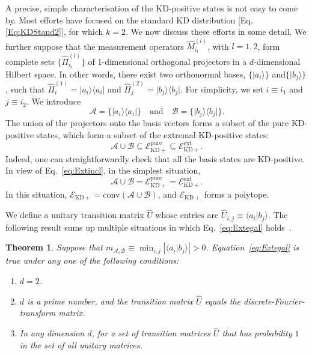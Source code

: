 \documentclass[%
 reprint,
superscriptaddress,
nofootinbib,
bibnotes,
 amsmath,amssymb,
 aps,
]{revtex4-1}
\theoremstyle{plain}
\newcommand*{\ketbra}[2]{\lvert #1 \rangle\!\langle #2 \rvert}
\newcommand{\cket}[1]{|#1\rangle}
\newcommand{\bracket}[2]{\langle #1|#2\rangle}
\newcommand{\Acal}{{\mathcal A}}
\newcommand{\Bcal}{{\mathcal B}}
\newcommand{\EcalKDC}{{\mathcal E}_{\mathrm{KD+}}}
\newcommand{\EcalKDCpu}{{\mathcal E}_{\mathrm{KD+}}^{\mathrm{pure}}}
\newcommand{\EcalKDCext}{{\mathcal E}_{\mathrm{KD+}}^{\mathrm{ext}}}
\newcommand{\mab}{m_{\Acal,\Bcal}}
\newcommand{\conv}[1]{\mathrm{conv}\left(#1\right)}
\newcommand{\convAB}{\conv{\Acal \cup \Bcal}}
\newtheorem{Theorem}{Theorem}[section]
\begin{document}
A precise, simple characterisation of the KD-positive states is not easy to come by. Most efforts have 
focused on the standard KD distribution [Eq. \eqref{Eq:KDStand2}], for which $k=2$.  We now discuss these efforts in some detail. We further suppose that the measurement operators 
$\hat{M}_{i_l}^{(l)}$,
with $l=1,2$, form complete sets 
$\big\{ \hat{\Pi}_{i_l}^{(l)} \big\}$
of 1-dimensional orthogonal projectors in a $d$-dimensional Hilbert space. In other words, there exist two orthonormal bases, $\{ \cket{a_i} \}$ and$ \{ \cket{b_j} \}$, such that $\hat{\Pi}_{i}^{(1)} = \ketbra{a_i}{a_i}$ and 
$\hat{\Pi}_{j}^{(2)} = \ketbra{b_j}{b_j}$.
For simplicity, we set $i\equiv i_1$ and $j \equiv i_2$.  We  introduce
\begin{equation}
    \Acal=\{ \ketbra{a_i}{a_i} \} \quad \mathrm{and} \quad   \Bcal=\{ \ketbra{b_j}{b_j} \}.
\end{equation}
The union of the 
projectors onto the basis vectors forms a subset  of the pure KD-positive states, which 
form a subset of the extremal KD-positive states:
\begin{equation}
\label{eq:Extincl}
\Acal\cup\Bcal\subseteq \EcalKDCpu\subseteq \EcalKDCext.
\end{equation}
Indeed, one can straightforwardly check that all the basis states are  KD-positive. In view of Eq.~\eqref{eq:Extincl}, in the simplest situation,
\begin{equation}\label{eq:Extegal}
\Acal\cup\Bcal = \EcalKDCpu = \EcalKDCext.
\end{equation}
In this situation, $\EcalKDC=\convAB$, and $\EcalKDC$ forms  a  polytope.  

We define a unitary transition matrix $\hat{U}$ whose entries are $\hat{U}_{i,j} \equiv \bracket{a_i}{b_j}$. The following result sums up multiple situations
in which Eq.~\eqref{eq:Extegal} holds~\cite{langrenez2023characterizing}.
\begin{Theorem} 
Suppose that $\mab \equiv \min_{i,j} \left|\bracket{a_i}{b_j}\right|> 0$. Equation~\eqref{eq:Extegal} is true under any one of the following conditions:
\begin{enumerate}
	\item $d=2$.
	\item $d$ is a prime number, and the transition matrix $\hat{U}$ equals the discrete-Fourier-transform matrix.
	\item In any dimension $d$, for a set of transition matrices  $\hat{U}$ that has probability  $1$  in the set of all unitary matrices. 
\end{enumerate}
\end{Theorem}
\end{document}
